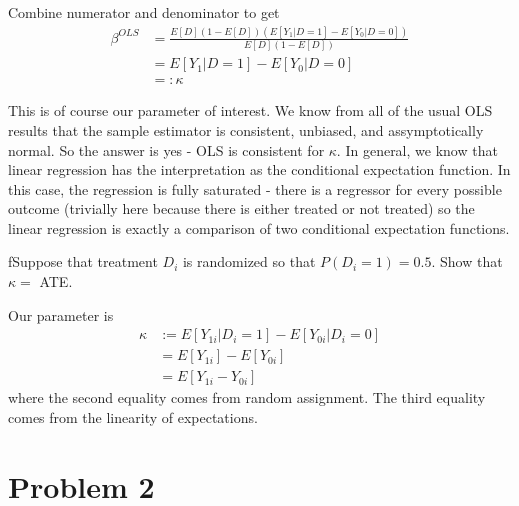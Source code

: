 \documentclass{article}
\begin{document}
\begin{solution}
Combine numerator and denominator to get
\begin{align*}
\beta^{OLS} & =\frac{E\left[D\right]\left(1-E\left[D\right]\right)\left(E\left[Y_{1}|D=1\right]-E\left[Y_{0}|D=0\right]\right)}{E\left[D\right]\left(1-E\left[D\right]\right)}\\
 & =E\left[Y_{1}|D=1\right]-E\left[Y_{0}|D=0\right]\\
 & =:\kappa
\end{align*}

This is of course our parameter of interest. We know from all of the
usual OLS results that the sample estimator is consistent, unbiased,
and assymptotically normal. So the answer is yes - OLS is consistent
for $\kappa$. In general, we know that linear regression has the
interpretation as the conditional expectation function. In this case,
the regression is fully saturated - there is a regressor for every
possible outcome (trivially here because there is either treated or
not treated) so the linear regression is exactly a comparison of two
conditional expectation functions. 

\end{solution}

\begin{problem}{f}Suppose that treatment $D_{i}$ is randomized so that $P\left(D_{i}=1\right)=0.5$. Show that $\kappa=$ ATE.
\end{problem}
\begin{solution}
Our parameter is 
\begin{align*}
\kappa & :=E\left[Y_{1i}|D_{i}=1\right]-E\left[Y_{0i}|D_{i}=0\right]\\
 & =E\left[Y_{1i}\right]-E\left[Y_{0i}\right]\\
 & =E\left[Y_{1i}-Y_{0i}\right]
\end{align*}
where the second equality comes from random assignment. The third
equality comes from the linearity of expectations. 
\end{solution}

\newpage
\section*{Problem 2}
\end{document}
